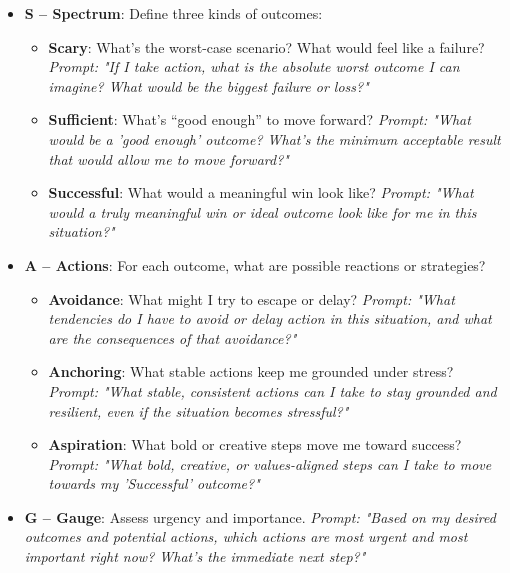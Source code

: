 \documentclass{article}
\begin{document}
\begin{center}
\end{center}

\begin{itemize}[noitemsep,topsep=0pt]
    \item \textbf{S – Spectrum}: Define three kinds of outcomes:
    \begin{itemize}[noitemsep,topsep=0pt]
        \item \textbf{Scary}: What's the worst-case scenario? What would feel like a failure? \textit{Prompt: "If I take action, what is the absolute worst outcome I can imagine? What would be the biggest failure or loss?"}
        \item \textbf{Sufficient}: What's ``good enough'' to move forward? \textit{Prompt: "What would be a 'good enough' outcome? What's the minimum acceptable result that would allow me to move forward?"}
        \item \textbf{Successful}: What would a meaningful win look like? \textit{Prompt: "What would a truly meaningful win or ideal outcome look like for me in this situation?"}
    \end{itemize}
    \item \textbf{A – Actions}: For each outcome, what are possible reactions or strategies?
    \begin{itemize}[noitemsep,topsep=0pt]
        \item \textbf{Avoidance}: What might I try to escape or delay? \textit{Prompt: "What tendencies do I have to avoid or delay action in this situation, and what are the consequences of that avoidance?"}
        \item \textbf{Anchoring}: What stable actions keep me grounded under stress? \textit{Prompt: "What stable, consistent actions can I take to stay grounded and resilient, even if the situation becomes stressful?"}
        \item \textbf{Aspiration}: What bold or creative steps move me toward success? \textit{Prompt: "What bold, creative, or values-aligned steps can I take to move towards my 'Successful' outcome?"}
    \end{itemize}
    \item \textbf{G – Gauge}: Assess urgency and importance. \textit{Prompt: "Based on my desired outcomes and potential actions, which actions are most urgent and most important right now? What's the immediate next step?"}

\end{itemize}
\end{document}

